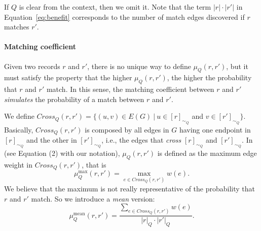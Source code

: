 \documentclass[sigconf, nonacm]{acmart}
\begin{document}
If $Q$ is clear from the context, then we omit it. Note that the term $|r|\cdot|r'|$ in Equation~\ref{eq:benefit} corresponds to the number of match edges discovered if $r$ matches $r'$. %

\paragraph{Matching coefficient}\label{subsub:matching_coefficient}

Given two records $r$ and $r'$, there is no unique way to define $\mu_Q(r,r')$, but it must satisfy the property that the higher $\mu_Q(r,r')$, the higher the probability that $r$ and $r'$ match. In this sense, the matching coefficient between $r$ and $r'$ \emph{simulates} the probability of a match between $r$ and $r'$.

We define $\textit{Cross}_Q(r,r') =\{(u,v)\in E(G) \ | \ u\in [r]_{\sim_Q}$ and $v\in [r']_{\sim_Q}\}$. Basically, $\textit{Cross}_Q(r,r')$ is composed by all edges in $G$ having one endpoint in $[r]_{\sim_Q}$ and the other in $[r']_{\sim_Q}$, i.e., the edges that \emph{cross} $[r]_{\sim_Q}$ and $[r']_{\sim_Q}$. In~\cite{firmani2016online} (see Equation (2) with our notation), $\mu_Q(r,r')$ is defined as the maximum edge weight in $\textit{Cross}_Q(r,r')$, that is
\begin{equation}\label{eq:crossing_DD}
     \mu_Q^{\max}(r,r') = \max_{e\in \textit{Cross}_Q(r,r')}w(e).
\end{equation}
We believe that the maximum is not really representative of the probability that $r$ and $r'$ match. 
So we introduce a \emph{mean} version:
\begin{equation}\label{eq:crossing_density}
     \mu_Q^{\text{mean}}(r,r') = \frac{\sum_{e\in \textit{Cross}_Q(r,r')}w(e)}{|r|_Q\cdot|r'|_Q}.
\end{equation}

\end{document}
